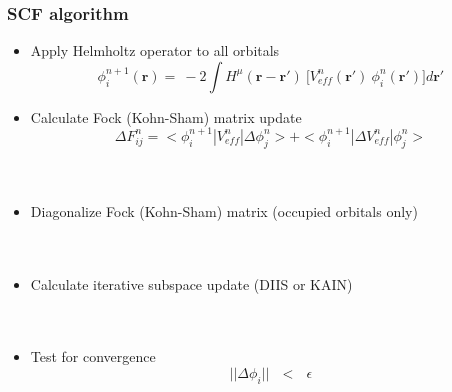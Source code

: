 \documentclass[mathserif]{beamer}
\begin{document}
\begin{frame}
    \frametitle{SCF algorithm}
    \begin{itemize}
	\item Apply Helmholtz operator to all orbitals
	    \begin{equation}
		\nonumber
		\phi^{n+1}_i(\boldsymbol{r}) =\ -2\int H^{\mu}(\boldsymbol{r}-\boldsymbol{r}')\
		\Big[V^n_{eff}(\boldsymbol{r}')\ \phi^n_i(\boldsymbol{r}')\Big] d\boldsymbol{r}'
	    \end{equation}
	\pause
	\item Calculate Fock (Kohn-Sham) matrix update
	    \begin{equation}
		\nonumber
		\Delta F^n_{ij} = < \phi^{n+1}_i | V^n_{eff} | \Delta \phi^{n}_j >
		+ < \phi^{n+1}_i | \Delta V^n_{eff} | \phi^{n}_j >
	    \end{equation} 
		\ \\
		\ \\
	\pause
	\item Diagonalize Fock (Kohn-Sham) matrix (occupied orbitals only)\\
		\ \\
		\ \\
	\pause
	\item Calculate iterative subspace update (DIIS or KAIN)\\
		\ \\
		\ \\
	\pause
	\item Test for convergence
	    \begin{equation}
		\nonumber
		||\Delta\phi_i||\ \ \ <\ \ \ \epsilon
	    \end{equation}
    \end{itemize}
\end{frame}
\end{document}
